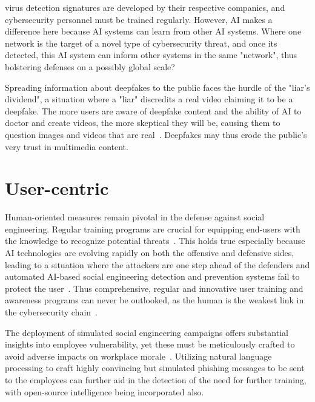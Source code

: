 virus detection signatures are developed by their respective companies, and cybersecurity personnel must be trained regularly. However, AI makes a difference here because AI systems can learn from other AI systems. Where one network is the target of a novel type of cybersecurity threat, and once its detected, this AI system can inform other systems in the same "network", thus bolstering defenses on a possibly global scale?

Spreading information about deepfakes to the public faces the hurdle of the "liar's dividend", a situation where a "liar" discredits a real video claiming it to be a deepfake. The more users are aware of deepfake content and the ability of AI to doctor and create videos, the more skeptical they will be, causing them to question images and videos that are real~\citep{blauth_AI_Crime_Overview_Malicious_Use_Abuse_2022}. Deepfakes may thus erode the public's very trust in multimedia content.



\section{User-centric}
\begin{comment}    
    - Deepfake content detection
    - Spear phishing detection
\end{comment}

Human-oriented measures remain pivotal in the defense against social engineering. Regular training programs are crucial for equipping end-users with the knowledge to recognize potential threats~\citep{hadnagy_Social_Engineering_The_Science_2018}. This holds true especially because AI technologies are evolving rapidly on both the offensive and defensive sides, leading to a situation where the attackers are one step ahead of the defenders and automated AI-based social engineering detection and prevention systems fail to protect the user~\citep{fakhouri_AI_Driven_Solutions_SE_Attacks_2024}. Thus comprehensive, regular and innovative user training and awareness programs can never be outlooked, as the human is the weakest link in the cybersecurity chain~\citep{mitnick_The_Art_of_Deception_2003}.

The deployment of simulated social engineering campaigns offers substantial insights into employee vulnerability, yet these must be meticulously crafted to avoid adverse impacts on workplace morale~\citep{mitnick_The_Art_of_Deception_2003}. Utilizing natural language processing to craft highly convincing but simulated phishing messages to be sent to the employees can further aid in the detection of the need for further training, with open-source intelligence being incorporated also.

